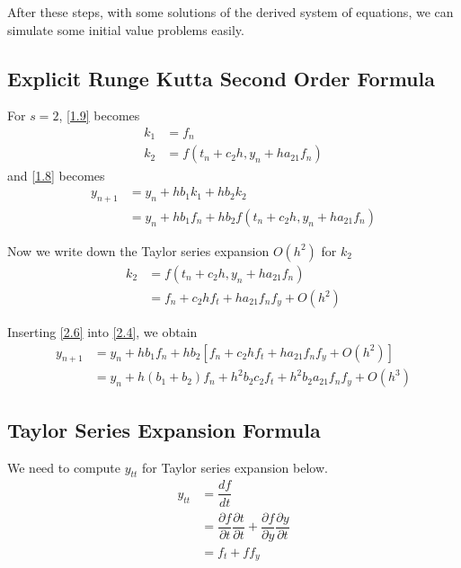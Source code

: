 \documentclass[a4paper,oneside]{book}
\numberwithin{equation}{chapter}
\begin{document}
After these steps, with some solutions of the derived system of equations, we can simulate some initial value problems easily.
\subsection{Explicit Runge Kutta Second Order Formula}
For $s=2$, \eqref{1.9} becomes
\begin{align}
{k_1} &= {f_n}\\
{k_2} &= f\left( {{t_n} + {c_2}h,{y_n} + h{a_{21}}{f_n}} \right)
\end{align}
and \eqref{1.8} becomes
\begin{align}
{{y_{n + 1}}} &= {{y_n}} + h{b_1}{k_1} + h{b_2}{k_2}\\
 &= {{y_n}} + h{b_1}{f_n} + h{b_2}f\left( {{t_n} + {c_2}h,{y_n} + h{a_{21}}{f_n}} \right)
 \label{2.4}
\end{align}

Now we write down the Taylor series expansion $O\left(h^2\right)$ for ${k_2} $
\begin{align}
{k_2} &= f\left( {{t_n} + {c_2}h,{y_n} + h{a_{21}}{f_n}} \right)\\
 &= {f_n} + {c_2}h{f_t} + h{a_{21}}{f_n}{f_y} + O\left( {{h^2}} \right)
\label{2.6}
\end{align}

Inserting \eqref{2.6} into \eqref{2.4}, we obtain
\begin{align}
{{y_{n + 1}}} &= {{y_n}} + h{b_1}{f_n} + h{b_2}\left[ {{f_n} + {c_2}h{f_t} + h{a_{21}}{f_n}{f_y} + O\left( {{h^2}} \right)} \right]\\
 &= {{y_n}} + h\left( {{b_1} + {b_2}} \right){f_n} + {h^2}{b_2}{c_2}{f_t} + {h^2}{b_2}{a_{21}}{f_n}{f_y} + O\left( {{h^3}} \right)
 \label{2.8}
\end{align}
\subsection{Taylor Series Expansion Formula}
We need to compute $y_{tt}$ for Taylor series expansion below.
\begin{align}
{y_{tt}} &= \dfrac{{df}}{{dt}}\\
 &= \dfrac{{\partial f}}{{\partial t}}\dfrac{{\partial t}}{{\partial t}} + \dfrac{{\partial f}}{{\partial y}}\dfrac{{\partial y}}{{\partial t}}\\
 &= {f_t} + f{f_y}
\end{align}
\end{document}

